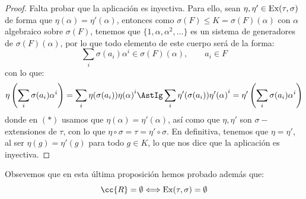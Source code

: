 \begin{prop}[Extensión I]
\begin{proof}
        Falta probar que la aplicación es inyectiva. Para ello, sean $\eta,\eta' \in \operatorname{Ex}(\tau,\sigma)$ de forma que $\eta(\alpha)=\eta'(\alpha)$, entonces como $\sigma(F)\leq K=\sigma(F)(\alpha)$ con $\alpha$ algebraico sobre $\sigma(F)$, tenemos que $\{1,\alpha,\alpha^2, \ldots\}$ es un sistema de generadores de $\sigma(F)(\alpha)$, por lo que todo elemento de este cuerpo será de la forma:
        \begin{equation*}
            \sum_{i} \sigma(a_i) \alpha^i \in \sigma(F)(\alpha), \qquad a_i \in F
        \end{equation*}
        con lo que:
        \begin{equation*}
            \eta\left(\sum_{i}\sigma(a_i)\alpha^i\right) = \sum_i \eta(\sigma(a_i)) {\eta(\alpha)}^{i} \AstIg \sum_i \eta'(\sigma(a_i)) {\eta'(\alpha)}^{i} = \eta'\left(\sum_{i}\sigma(a_i)\alpha^i\right) 
        \end{equation*}
        donde en $(\ast)$ usamos que $\eta(\alpha) = \eta'(\alpha)$, así como que $\eta, \eta'$ son $\sigma-$extensiones de $\tau$, con lo que $\eta\circ \sigma = \tau = \eta'\circ \sigma$. En definitiva, tenemos que $\eta = \eta'$, al ser $\eta(g) = \eta'(g)$ para todo $g\in K$, lo que nos dice que la aplicación es inyectiva.
    \end{proof}
\end{prop}

\noindent
Obsevemos que en esta última proposición hemos probado además que:
\begin{equation*}
    \cc{R}= \emptyset  \Longleftrightarrow \Ex(\tau,\sigma) =  \emptyset 
\end{equation*}

